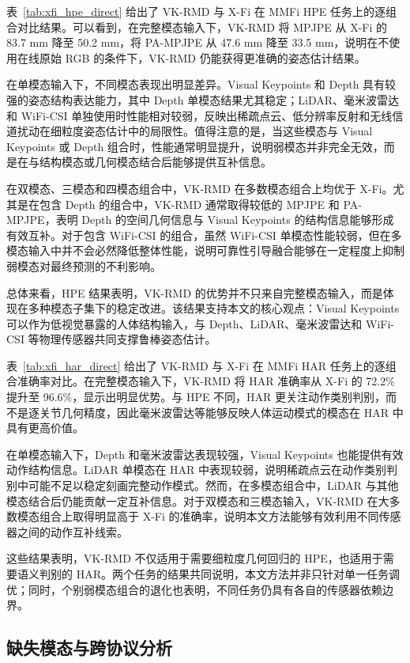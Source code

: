 \documentclass[journal]{IEEEtran}
\newcommand{\parahead}[1]{\vspace{0.4em}\noindent{\textbf{#1}}}
\begin{document}
\parahead{人体姿态估计。}
表~\ref{tab:xfi_hpe_direct} 给出了 VK-RMD 与 X-Fi 在 MMFi HPE 任务上的逐组合对比结果。可以看到，在完整模态输入下，VK-RMD 将 MPJPE 从 X-Fi 的 83.7 mm 降至 50.2 mm，将 PA-MPJPE 从 47.6 mm 降至 33.5 mm，说明在不使用在线原始 RGB 的条件下，VK-RMD 仍能获得更准确的姿态估计结果。

在单模态输入下，不同模态表现出明显差异。Visual Keypoints 和 Depth 具有较强的姿态结构表达能力，其中 Depth 单模态结果尤其稳定；LiDAR、毫米波雷达和 WiFi-CSI 单独使用时性能相对较弱，反映出稀疏点云、低分辨率反射和无线信道扰动在细粒度姿态估计中的局限性。值得注意的是，当这些模态与 Visual Keypoints 或 Depth 组合时，性能通常明显提升，说明弱模态并非完全无效，而是在与结构模态或几何模态结合后能够提供互补信息。

在双模态、三模态和四模态组合中，VK-RMD 在多数模态组合上均优于 X-Fi。尤其是在包含 Depth 的组合中，VK-RMD 通常取得较低的 MPJPE 和 PA-MPJPE，表明 Depth 的空间几何信息与 Visual Keypoints 的结构信息能够形成有效互补。对于包含 WiFi-CSI 的组合，虽然 WiFi-CSI 单模态性能较弱，但在多模态输入中并不会必然降低整体性能，说明可靠性引导融合能够在一定程度上抑制弱模态对最终预测的不利影响。

总体来看，HPE 结果表明，VK-RMD 的优势并不只来自完整模态输入，而是体现在多种模态子集下的稳定改进。该结果支持本文的核心观点：Visual Keypoints 可以作为低视觉暴露的人体结构输入，与 Depth、LiDAR、毫米波雷达和 WiFi-CSI 等物理传感器共同支撑鲁棒姿态估计。

\parahead{人体活动识别。}
表~\ref{tab:xfi_har_direct} 给出了 VK-RMD 与 X-Fi 在 MMFi HAR 任务上的逐组合准确率对比。在完整模态输入下，VK-RMD 将 HAR 准确率从 X-Fi 的 72.2\% 提升至 96.6\%，显示出明显优势。与 HPE 不同，HAR 更关注动作类别判别，而不是逐关节几何精度，因此毫米波雷达等能够反映人体运动模式的模态在 HAR 中具有更高价值。 

在单模态输入下，Depth 和毫米波雷达表现较强，Visual Keypoints 也能提供有效动作结构信息。LiDAR 单模态在 HAR 中表现较弱，说明稀疏点云在动作类别判别中可能不足以稳定刻画完整动作模式。然而，在多模态组合中，LiDAR 与其他模态结合后仍能贡献一定互补信息。对于双模态和三模态输入，VK-RMD 在大多数模态组合上取得明显高于 X-Fi 的准确率，说明本文方法能够有效利用不同传感器之间的动作互补线索。

这些结果表明，VK-RMD 不仅适用于需要细粒度几何回归的 HPE，也适用于需要语义判别的 HAR。两个任务的结果共同说明，本文方法并非只针对单一任务调优；同时，个别弱模态组合的退化也表明，不同任务仍具有各自的传感器依赖边界。


\subsection{缺失模态与跨协议分析}
\end{document}

